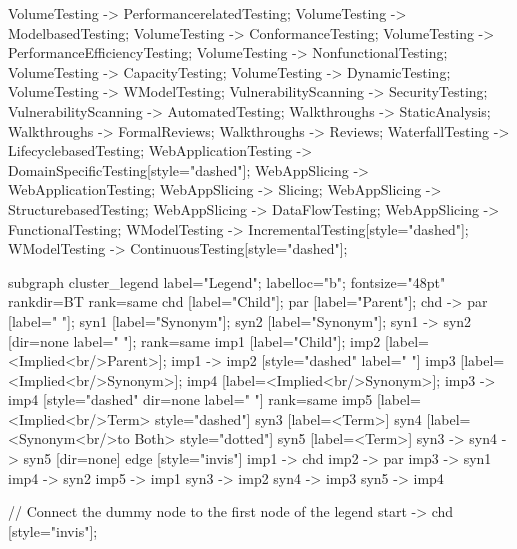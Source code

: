 \documentclass{article}
\begin{document}
{VolumeTesting -> PerformancerelatedTesting;
VolumeTesting -> ModelbasedTesting;
VolumeTesting -> ConformanceTesting;
VolumeTesting -> PerformanceEfficiencyTesting;
VolumeTesting -> NonfunctionalTesting;
VolumeTesting -> CapacityTesting;
VolumeTesting -> DynamicTesting;
VolumeTesting -> WModelTesting;
VulnerabilityScanning -> SecurityTesting;
VulnerabilityScanning -> AutomatedTesting;
Walkthroughs -> StaticAnalysis;
Walkthroughs -> FormalReviews;
Walkthroughs -> Reviews;
WaterfallTesting -> LifecyclebasedTesting;
WebApplicationTesting -> DomainSpecificTesting[style="dashed"];
WebAppSlicing -> WebApplicationTesting;
WebAppSlicing -> Slicing;
WebAppSlicing -> StructurebasedTesting;
WebAppSlicing -> DataFlowTesting;
WebAppSlicing -> FunctionalTesting;
WModelTesting -> IncrementalTesting[style="dashed"];
WModelTesting -> ContinuousTesting[style="dashed"];

subgraph cluster_legend {
    label="Legend";
    labelloc="b";
    fontsize="48pt"
    rankdir=BT
    {
        rank=same
        chd [label="Child"];
        par [label="Parent"];
        chd -> par [label="                "];
        syn1 [label="Synonym"];
        syn2 [label="Synonym"];
        syn1 -> syn2 [dir=none label="                "];
    }
    {
        rank=same
        imp1 [label="Child"];
        imp2 [label=<Implied<br/>Parent>];
        imp1 -> imp2 [style="dashed" label="                "]
        imp3 [label=<Implied<br/>Synonym>];
        imp4 [label=<Implied<br/>Synonym>];
        imp3 -> imp4 [style="dashed" dir=none label="                "]
    }
    {
        rank=same
        imp5 [label=<Implied<br/>Term> style="dashed"]
        syn3 [label=<Term>]
        syn4 [label=<Synonym<br/>to Both> style="dotted"]
        syn5 [label=<Term>]
        syn3 -> syn4 -> syn5 [dir=none]
    }
    edge [style="invis"]
    imp1 -> chd
    imp2 -> par
    imp3 -> syn1
    imp4 -> syn2
imp5 -> imp1
syn3 -> imp2
syn4 -> imp3
syn5 -> imp4
}

// Connect the dummy node to the first node of the legend
start -> chd [style="invis"];
}
\end{document}
